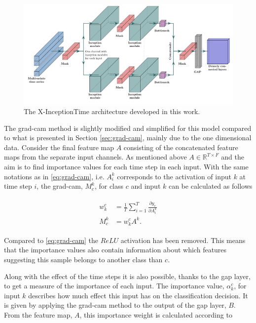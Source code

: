 \begin{figure}
  \centering
  \includegraphics[width=\textwidth]{files/figs/x-inception-w-masks.pdf}
  \caption{The X-InceptionTime architecture developed in this work.}
  \label{fig:x-inception}
\end{figure}

The \gls{grad-cam} method is slightly modified and simplified for this model compared to what is presented in Section \ref{sec:grad-cam}, mainly due to the one dimensional data. Consider the final feature map $A$ consisting of the concatenated feature maps from the separate input channels. As mentioned above $A \in \mathbb{R}^{T \times F}$ and the aim is to find importance values for each time step in each input. With the same notations as in \eqref{eq:grad-cam}, i.e. $A_i^k$ corresponds to the activation of input $k$ at time step $i$, the \gls{grad-cam}, $M_c^k$, for class $c$ and input $k$ can be calculated as follows

\begin{align}
    \begin{split}
        w_k^c &= \frac{1}{T}\sum_{i=1}^T \frac{\partial y_c}{\partial A_i^k} \\
        M_c^k &= w_k^c A^k.
    \end{split}
    \label{eq:grad-cam-x}
\end{align}

 Compared to \eqref{eq:grad-cam} the $ReLU$ activation has been removed. This means that the importance values also contain information about which features suggesting this sample belongs to another class than $c$.

 Along with the effect of the time steps it is also possible, thanks to the \gls{gap} layer, to get a measure of the importance of each input. The importance value, $\alpha_k^c$, for input $k$ describes how much effect this input has on the classification decision. It is given by applying the \gls{grad-cam} method to the output of the \gls{gap} layer, $B$. From the feature map, $A$, this importance weight is calculated according to

